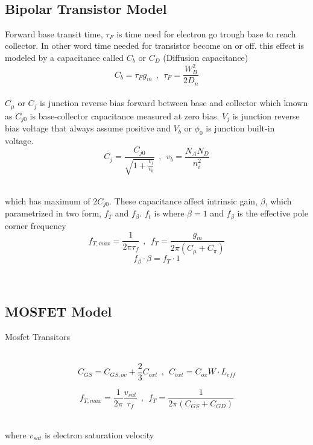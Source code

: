 ~\vspace{-3em}
\subsection{Bipolar Transistor Model}\vspace{0.5em}
Forward base transit time, $\tau_F$ is time need for electron go trough base to reach collector. In other word time needed for transistor become on or off. this effect is modeled by a capacitance called $C_b$ or $C_D$ (Diffusion capacitance) ~\\
\begin{equation}
C_b = \tau_F g_m ~~ , ~~\tau_F = \frac{W_B^2}{2D_n}
\end{equation}
~\\
$C_{\mu}$ or $C_j$ is junction reverse bias forward between base and collector which known as $C_{j0}$ is base-collector capacitance measured at zero bias. $V_j$ is junction reverse bias voltage that always assume positive and $V_b$ or $\phi_0$ is junction built-in voltage.~\\

\begin{equation}
C_j = \frac{C_{j0}}{\sqrt{1 + \frac{v_j}{v_b}}} ~~ , ~~ v_b = \frac{N_A N_D}{n_i^2} 
\end{equation}

~\\which has maximum of $ 2 C_{j0} $. These capacitance affect intrinsic gain, $\beta$, which parametrized in two form, $f_T$ and $f_{\beta}$. $f_t$ is where $\beta=1$ and $f_{\beta}$ is the effective pole corner frequency~\\

\begin{equation}
f_{T,max} = \frac{1}{2\pi\tau_f} ~~ , ~~ f_{T} = \frac{g_m}{2\pi (C_{\mu} + C_\pi)}
\end{equation}
\begin{equation}
f_{\beta} \cdot \beta = f_T \cdot 1
\end{equation}

~

\par
\setlength{\parindent}{0.5cm} %
\lipsum[1]
\setlength{\parindent}{0.0cm} 
\subsection{MOSFET Model}\vspace{0.5em}
Mosfet Transitors

~\\
\begin{equation}
C_{GS} = C_{GS,ov} + \frac{2}{3} C_{oxt} ~~ , ~~ C_{oxt} = C_{ox} W \cdot L_{eff}
\end{equation}

\begin{equation}
f_{T,max} = \frac{1}{2\pi}\frac{v_{sat}}{\tau_f} ~~ , ~~ f_{T} = \frac{1}{2\pi (C_{GS} + C_{GD})}
\end{equation}~

where $v_{sat}$ is electron saturation velocity
